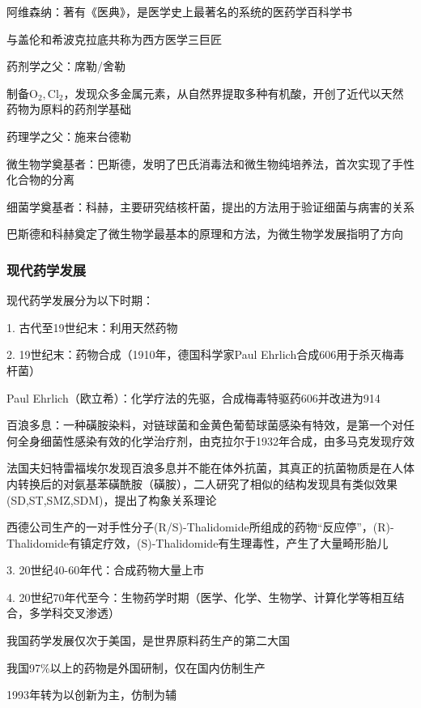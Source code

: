 \begin{notation}
    阿维森纳：著有《医典》，是医学史上最著名的系统的医药学百科学书

    与盖伦和希波克拉底共称为西方医学三巨匠
\end{notation}
\begin{notation}
    药剂学之父：席勒/舍勒

    制备$\text{O}_2,\text{Cl}_2$，发现众多金属元素，从自然界提取多种有机酸，开创了近代以天然药物为原料的药剂学基础
\end{notation}
\begin{notation}
    药理学之父：施来台德勒

    微生物学奠基者：巴斯德，发明了巴氏消毒法和微生物纯培养法，首次实现了手性化合物的分离

    细菌学奠基者：科赫，主要研究结核杆菌，提出的方法用于验证细菌与病害的关系

    巴斯德和科赫奠定了微生物学最基本的原理和方法，为微生物学发展指明了方向
\end{notation}
\subsubsection{现代药学发展}%
\label{subsub:现代药学发展}
现代药学发展分为以下时期：

1. 古代至19世纪末：利用天然药物

2. 19世纪末：药物合成（1910年，德国科学家Paul Ehrlich合成606用于杀灭梅毒杆菌）
\begin{notation}
    Paul Ehrlich（欧立希）：化学疗法的先驱，合成梅毒特驱药606并改进为914
\end{notation}
\begin{notation}
    百浪多息：一种磺胺染料，对链球菌和金黄色葡萄球菌感染有特效，是第一个对任何全身细菌性感染有效的化学治疗剂，由克拉尔于1932年合成，由多马克发现疗效
\end{notation}
\begin{notation}
    法国夫妇特雷福埃尔发现百浪多息并不能在体外抗菌，其真正的抗菌物质是在人体内转换后的对氨基苯磺酰胺（磺胺），二人研究了相似的结构发现具有类似效果(SD,ST,SMZ,SDM)，提出了构象关系理论
\end{notation}
\begin{notation}
    西德公司生产的一对手性分子(R/S)-Thalidomide所组成的药物“反应停”，(R)-Thalidomide有镇定疗效，(S)-Thalidomide有生理毒性，产生了大量畸形胎儿
\end{notation}
3. 20世纪40-60年代：合成药物大量上市

4. 20世纪70年代至今：生物药学时期（医学、化学、生物学、计算化学等相互结合，多学科交叉渗透）
\begin{notation}
    我国药学发展仅次于美国，是世界原料药生产的第二大国

    我国97\%以上的药物是外国研制，仅在国内仿制生产

    1993年转为以创新为主，仿制为辅
\end{notation}
